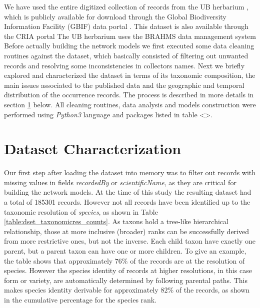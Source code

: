 We have used the entire digitized collection of records from the UB herbarium \cite{gbif_ubdataset}, which is publicly available for download through the Global Biodiversity Information Facility (GBIF) data portal \cite{gbif}.
This dataset is also available through the CRIA portal %
The UB herbarium uses the BRAHMS data management system %
%
Before actually building the network models we first executed some data cleaning routines against the dataset, which basically consisted of filtering out unwanted records and resolving some inconsistencies in collectors names.
%
Next we briefly explored and characterized the dataset in terms of its taxonomic composition, the main issues associated to the published data and the geographic and temporal distribution of the occurrence records.
%
The process is described in more details in section \ref{section:ub_characterization} below.
%
All cleaning routines, data analysis and models construction were performed using \textit{Python3} language and packages listed in table <>. %









\section{Dataset Characterization}\label{section:ub_characterization}


Our first step after loading the dataset into memory was to filter out records with missing values in fields \textit{recordedBy} or \textit{scientificName}, as they are critical for building the network models.
At the time of this study the resulting dataset had a total of 185301 records. However not all records have been identified up to the taxonomic resolution of \textit{species}, as shown in Table \ref{table:dset_taxonomicres_counts}. 
As taxons hold a tree-like hierarchical relationship, those at more inclusive (broader) ranks can be successfully derived from more restrictive ones, but not the inverse. Each child taxon have exactly one parent, but a parent taxon can have one or more children.
To give an example, the table shows that approximately $76\%$ of the records are at the resolution of species. However the species identity of records at higher resolutions, in this case form or variety, are automatically determined by following parental paths. This makes species identity derivable for approximately $82\%$ of the records, as shown in the cumulative percentage for the species rank.

